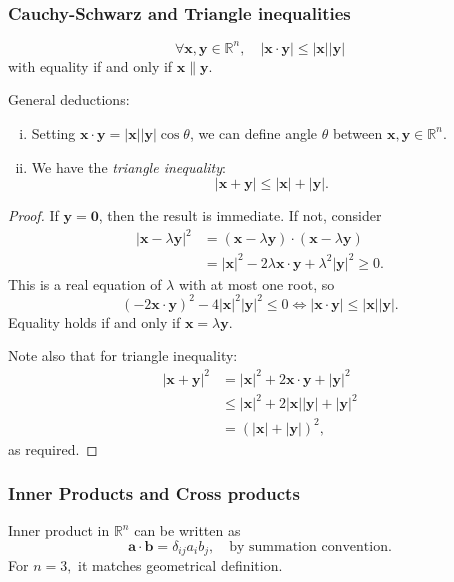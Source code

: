 \documentclass[a4paper]{article}
\begin{document}
\subsubsection{Cauchy-Schwarz and Triangle inequalities}
\begin{proposition}\label{prop:cauchy-schwarz}
  \[
    \forall \mathbf{x}, \mathbf{y}\in \mathbb{R}^n,\quad
    |\mathbf{x}\cdot \mathbf{y}|\le |\mathbf{x}| | \mathbf{y}|
  \]
  with equality if and only if $ \mathbf{x}\parallel \mathbf{y} $.
\end{proposition}
General deductions:
\begin{enumerate}[(i).]
  \item Setting $ \mathbf{x}\cdot
    \mathbf{y}=|\mathbf{x}||\mathbf{y}|\cos \theta $, we can define
    angle $ \theta $ between $ \mathbf{x},\mathbf{y}\in \mathbb{R}^n $.
  \item We have the \textit{triangle inequality}:
    \[
      |\mathbf{x}+\mathbf{y}|\le|\mathbf{x}|+|\mathbf{y}|
    .\]
\end{enumerate}
\begin{proof}
  If $ \mathbf{y}=\mathbf{0} $, then the result is immediate. If not, consider
  \[
    \begin{aligned}
      \left| \mathbf{x}-\lambda \mathbf{y} \right|^2&=
      (\mathbf{x}-\lambda \mathbf{y})\cdot(\mathbf{x}-\lambda \mathbf{y})\\
      &= \left| \mathbf{x} \right|^2-2\lambda \mathbf{x}\cdot
      \mathbf{y}+\lambda^2 |\mathbf{y}|^2\ge 0.
    \end{aligned}
  \]
  This is a real equation of $\lambda$ with at most one root, so
  \[
    (-2 \mathbf{x}\cdot
    \mathbf{y})^2-4|\mathbf{x}|^2|\mathbf{y}|^2\le 0
    \Longleftrightarrow |\mathbf{x}\cdot \mathbf{y}|\le |\mathbf{x}|
    | \mathbf{y}|
  .\]
  Equality holds if and only if $ \mathbf{x}=\lambda \mathbf{y} $.

  Note also that for triangle inequality:
  \[
    \begin{aligned}
      |\mathbf{x}+\mathbf{y}|^2&= |\mathbf{x}|^2+2 \mathbf{x}\cdot
      \mathbf{y}+|\mathbf{y}|^2\\
      &\le |\mathbf{x}|^2+2 |\mathbf{x}| | \mathbf{y}|+|\mathbf{y}|^2\\
      &=(|\mathbf{x}|+|\mathbf{y}|)^2,
    \end{aligned}
  \]
  as required.
\end{proof}
\subsubsection{Inner Products and Cross products}
Inner product in $ \mathbb{R}^n $ can be written as
\[
  \mathbf{a}\cdot \mathbf{b}=\delta_{ij}a_{i}b_{j},\quad \text{by
  summation convention}
.\]
For $n=3,$ it matches geometrical definition.
\end{document}
